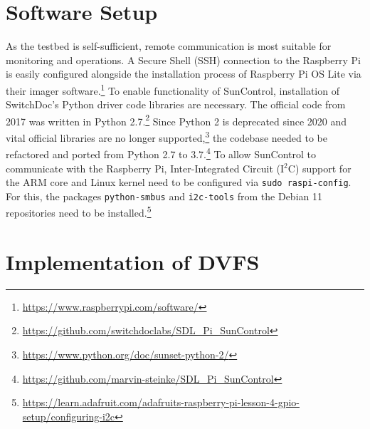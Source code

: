 \section{Software Setup}
\label{sec:software_setup}

As the testbed is self-sufficient, remote communication is most suitable for
monitoring and operations. A Secure Shell (SSH) connection to the Raspberry Pi
is easily configured alongside the installation process of Raspberry Pi OS Lite
via their imager software.\footnote{\url{https://www.raspberrypi.com/software/}}
To enable functionality of SunControl, installation of SwitchDoc's Python driver
code libraries are necessary. The official code from 2017 was written in Python
2.7.\footnote{\url{https://github.com/switchdoclabs/SDL_Pi_SunControl}} Since
Python 2 is deprecated since 2020 and vital official libraries are no longer
supported,\footnote{\url{https://www.python.org/doc/sunset-python-2/}} the
codebase needed to be refactored and ported from Python 2.7 to
3.7.\footnote{\url{https://github.com/marvin-steinke/SDL_Pi_SunControl}} To
allow SunControl to communicate with the Raspberry Pi, Inter-Integrated Circuit
(I$^2$C) support for the ARM core and Linux kernel need to be configured via
\texttt{sudo raspi-config}. For this, the packages \texttt{python-smbus} and
\texttt{i2c-tools} from the Debian 11 repositories need to be
installed.\footnote{\url{https://learn.adafruit.com/adafruits-raspberry-pi-lesson-4-gpio-setup/configuring-i2c}}


\section{Implementation of DVFS}
\label{sec:implementation_of_dvfs}

